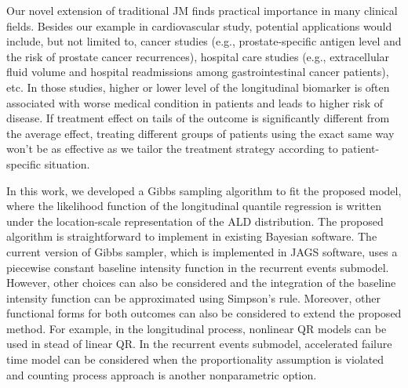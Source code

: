 Our novel extension of traditional JM finds practical importance in many clinical fields. Besides our example in cardiovascular study, potential applications would include, but not limited to, cancer studies (e.g., prostate-specific antigen level and the risk of prostate cancer recurrences), hospital care studies (e.g., extracellular fluid volume and hospital readmissions among gastrointestinal cancer patients), etc. In those studies, higher or lower level of the longitudinal biomarker is often associated with worse medical condition in patients and leads to higher risk of disease. If treatment effect on tails of the outcome is significantly different from the average effect, treating different groups of patients using the exact same way won't be as effective as we tailor the treatment strategy according to patient-specific situation.


In this work, we developed a Gibbs sampling algorithm to fit the proposed model, where the likelihood function of the longitudinal quantile regression is written under the location-scale representation of the ALD distribution. The proposed algorithm is straightforward to implement in existing Bayesian software. The current version of Gibbs sampler, which is implemented in \textsf{JAGS} software, uses a piecewise constant baseline intensity function in the recurrent events submodel. However, other choices can also be considered and the integration of the baseline intensity function can be approximated using Simpson's rule. Moreover, other functional forms for both outcomes can also be considered to extend the proposed method. For example, in the longitudinal process, nonlinear QR \citep{koenker1996interior} models can be used in stead of linear QR. In the recurrent events submodel, accelerated failure time model can be considered when the proportionality assumption is violated and counting process approach is another nonparametric option.


%
%
% 


% 

